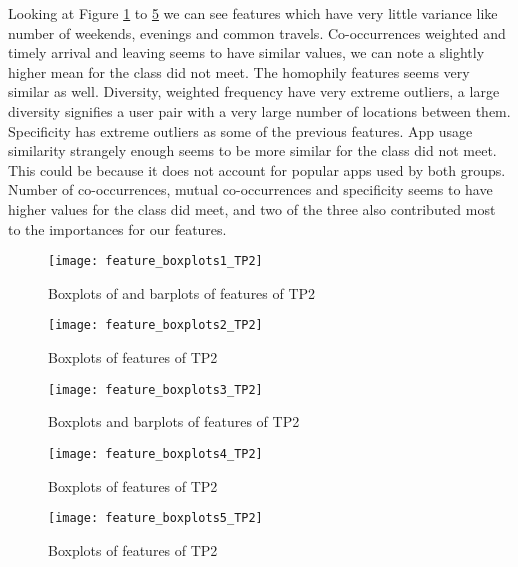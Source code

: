 Looking at Figure \ref{fig:feature_boxplots1} to \ref{fig:feature_boxplots5} we can see features which have very little variance like number of weekends, evenings and common travels. Co-occurrences weighted and timely arrival and leaving seems to have similar values, we can note a slightly higher mean for the class did not meet. The homophily features seems very similar as well. Diversity, weighted frequency have very extreme outliers, a large diversity signifies a user pair with a very large number of locations between them. Specificity has extreme outliers as some of the previous features. App usage similarity strangely enough seems to be more similar for the class did not meet. This could be because it does not account for popular apps used by both groups. Number of co-occurrences, mutual co-occurrences and specificity seems to have higher values for the class did meet, and two of the three also contributed most to the importances for our features.

\begin{figure}[H]
    \hspace*{-1.0cm}
    \centering
    \texttt{[image: feature\_boxplots1\_TP2]}
    \caption{Boxplots of and barplots of features of TP2}
    \label{fig:feature_boxplots1}
\end{figure}

\begin{figure}[H]
    \hspace*{-1.0cm}
    \centering
    \texttt{[image: feature\_boxplots2\_TP2]}
    \caption{Boxplots of features of TP2}
    \label{fig:feature_boxplots2}
\end{figure}
\begin{figure}[H]
    \hspace*{-1.0cm}
    \centering
    \texttt{[image: feature\_boxplots3\_TP2]}
    \caption{Boxplots and barplots of features of TP2}
    \label{fig:feature_boxplots3}
\end{figure}
\begin{figure}[H]
    \hspace*{-1.0cm}
    \centering
    \texttt{[image: feature\_boxplots4\_TP2]}
    \caption{Boxplots of features of TP2}
    \label{fig:feature_boxplots4}
\end{figure}
\begin{figure}[H]
    \hspace*{-1.0cm}
    \centering
    \texttt{[image: feature\_boxplots5\_TP2]}
    \caption{Boxplots of features of TP2}
    \label{fig:feature_boxplots5}
\end{figure}

